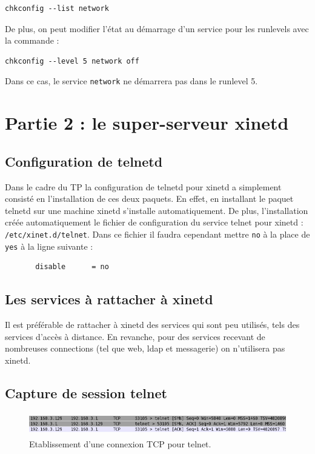 \documentclass[12pt,a4paper,notitlepage]{article}
\begin{document}
\begin{lstlisting}
chkconfig --list network
\end{lstlisting}
De plus, on peut modifier l'état au démarrage d'un service pour les runlevels avec la commande :
\begin{lstlisting}
chkconfig --level 5 network off
\end{lstlisting}
Dans ce cas, le service \texttt{network} ne démarrera pas dans le runlevel 5.


\section{Partie 2 : le super-serveur xinetd}
\subsection{Configuration de telnetd}
 
Dans le cadre du TP la configuration de telnetd pour xinetd a simplement consisté en l'installation de ces deux paquets. En effet, en installant le paquet telnetd sur une machine xinetd s'installe automatiquement. De plus, l'installation créée automatiquement le fichier de configuration du service telnet pour xinetd : \texttt{/etc/xinet.d/telnet}. Dans ce fichier il faudra cependant mettre \texttt{no} à la place de \texttt{yes} à la ligne suivante :
\begin{lstlisting}
       disable		= no
\end{lstlisting}

\subsection{Les services à rattacher à xinetd}
Il est préférable de rattacher à xinetd des services qui sont peu utilisés, tels des services d'accès à distance. En revanche, pour des services recevant de nombreuses connections (tel que web, ldap et messagerie) on n'utilisera pas xinetd.

\subsection{Capture de session telnet}
\begin{figure}[!h]
\begin{center}
\includegraphics[height=1cm]{syn_ack.png}
\caption{Etablissement d'une connexion TCP pour telnet.}
\label{fig:do}
\end{center}
\end{figure}
\end{document}
